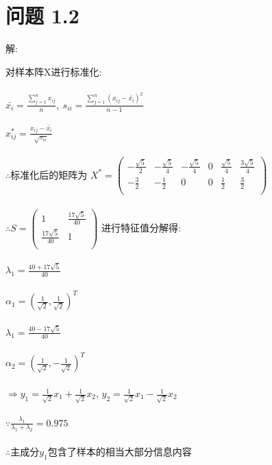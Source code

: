 \documentclass[]{article}
\begin{document}
\section{问题 1.2}
\begin{flushleft}
	解:
\end{flushleft}
对样本阵X进行标准化:\\\\
$\bar{x_i}=\frac{\sum_{j=1}^{n}x_{ij}}{n},\ s_{ii}=\frac{\sum_{j=1}^{n}(x_{ij}-\bar{x_i})^2}{n-1}$\\\\
$x^*_{ij}=\frac{x_{ij}-\bar{x_i}}{\sqrt{s_{ii}}}$\\\\
$\therefore$标准化后的矩阵为 $X^*=\begin{pmatrix}
	-\frac{\sqrt{5}}{2}&-\frac{\sqrt{5}}{4}&-\frac{\sqrt{5}}{4}&0&\frac{\sqrt{5}}{4}&\frac{3\sqrt{5}}{4}\\
	-\frac{3}{2}&-\frac{1}{2}&0&0&\frac{1}{2}&\frac{3}{2}\\
\end{pmatrix}$\\\\
$\therefore S=\begin{pmatrix}
1&\frac{17\sqrt{5}}{40}\\
\frac{17\sqrt{5}}{40}&1\\
\end{pmatrix}$
进行特征值分解得:\\\\
$\lambda_1=\frac{40+17\sqrt{5}}{40}$\\\\
$\alpha_1=(\frac{1}{\sqrt{2}},\frac{1}{\sqrt{2}})^T$\\\\
$\lambda_1=\frac{40-17\sqrt{5}}{40}$\\\\
$\alpha_2=(\frac{1}{\sqrt{2}},-\frac{1}{\sqrt{2}})^T$\\\\
$\Rightarrow y_1=\frac{1}{\sqrt{2}}x_1+\frac{1}{\sqrt{2}}x_2$, $y_2=\frac{1}{\sqrt{2}}x_1-\frac{1}{\sqrt{2}}x_2$\\\\
$\because \frac{\lambda_1}{\lambda_1+\lambda_2}=0.975$\\\\
$\therefore$主成分$y_1$包含了样本的相当大部分信息内容
\end{document}
